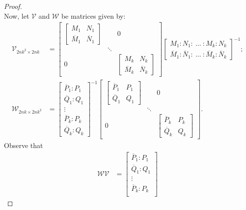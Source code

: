 \documentclass[10pt,reqno,oneside,a4paper]{article}
\begin{document}
\begin{proof}
\begin{equation}
\end{equation}
Now, let $\mathcal{V}$ and $\mathcal{W}$ be matrices given by:
\begin{align}
\mathcal{V}_{2nk^2\times 2nk} &= \begin{bmatrix}
\begin{bmatrix}
M_1 & N_1  \\
\overline{M}_1 & \overline{N}_1 
\end{bmatrix} & & 0 \\
 & \ddots & \\
0 & & 
\begin{bmatrix}
M_k & N_k  \\
\overline{M}_k & \overline{N}_k 
\end{bmatrix}
\end{bmatrix}
\begin{bmatrix}
M_1 : N_1 :~ \ldots ~: M_k : N_k \\
\overline{M}_1 : \overline{N}_1 :~ \ldots ~: \overline{M}_k : \overline{N}_k 
\end{bmatrix}^{-1};
 \\
\mathcal{W}_{2nk \times 2nk^2 } &= \begin{bmatrix}
\overline{P}_1 : P_1 \\
\overline{Q}_1 : Q_1 \\
\vdots \\
\overline{P}_k : P_k \\
\overline{Q}_k : Q_k 
\end{bmatrix}^{-1}
\begin{bmatrix}
\begin{bmatrix}
\overline{P}_1 & P_1 \\
\overline{Q}_1 & Q_1 
\end{bmatrix} 
 & & 0 \\
 & \ddots & \\
0 & & \begin{bmatrix}
\overline{P}_k & P_k \\
\overline{Q}_k & Q_k 
\end{bmatrix} 
\end{bmatrix}. 
\end{align}
Observe that 
\begin{align}
\mathcal{W} \mathcal{V} &= \begin{bmatrix}
\overline{P}_1 : P_1 \\
\overline{Q}_1 : Q_1 \\
\vdots \\
\overline{P}_k : P_k \\

\end{bmatrix}
\end{align}
\end{proof}
\end{document}
